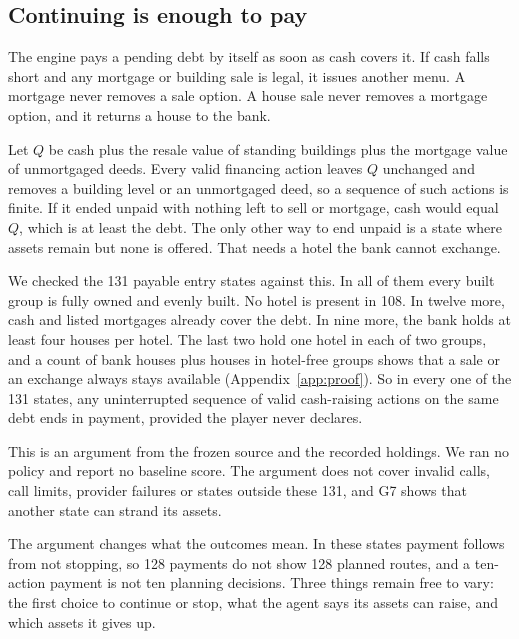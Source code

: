 \subsection{Continuing is enough to pay}
The engine pays a pending debt by itself as soon as cash covers it. If cash falls short and any mortgage or building sale is legal, it issues another menu. A mortgage never removes a sale option. A house sale never removes a mortgage option, and it returns a house to the bank.

Let $Q$ be cash plus the resale value of standing buildings plus the mortgage value of unmortgaged deeds. Every valid financing action leaves $Q$ unchanged and removes a building level or an unmortgaged deed, so a sequence of such actions is finite. If it ended unpaid with nothing left to sell or mortgage, cash would equal $Q$, which is at least the debt. The only other way to end unpaid is a state where assets remain but none is offered. That needs a hotel the bank cannot exchange.

We checked the 131 payable entry states against this. In all of them every built group is fully owned and evenly built. No hotel is present in 108. In twelve more, cash and listed mortgages already cover the debt. In nine more, the bank holds at least four houses per hotel. The last two hold one hotel in each of two groups, and a count of bank houses plus houses in hotel-free groups shows that a sale or an exchange always stays available (Appendix~\ref{app:proof}). So in every one of the 131 states, any uninterrupted sequence of valid cash-raising actions on the same debt ends in payment, provided the player never declares.

This is an argument from the frozen source and the recorded holdings. We ran no policy and report no baseline score. The argument does not cover invalid calls, call limits, provider failures or states outside these 131, and G7 shows that another state can strand its assets.

The argument changes what the outcomes mean. In these states payment follows from not stopping, so 128 payments do not show 128 planned routes, and a ten-action payment is not ten planning decisions. Three things remain free to vary: the first choice to continue or stop, what the agent says its assets can raise, and which assets it gives up.
